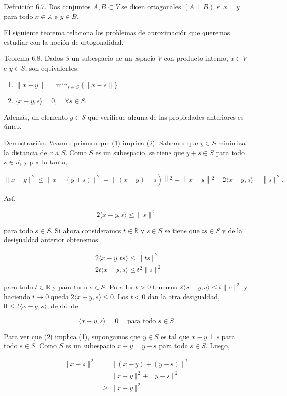 \documentclass[10pt]{article}
\begin{document}
Definición 6.7. Dos conjuntos $A, B \subset V$ se dicen ortogonales $(A \perp B)$ si $x \perp y$ para todo $x \in A$ e $y \in B$.

El siguiente teorema relaciona los problemas de aproximación que queremos estudiar con la noción de ortogonalidad.

Teorema 6.8. Dados $S$ un subespacio de un espacio $V$ con producto interno, $x \in V$ e $y \in S$, son equivalentes:

\begin{enumerate}
  \item $\|x-y\|=\min _{s \in S}\{\|x-s\|\}$
  \item $\langle x-y, s\rangle=0, \quad \forall s \in S$.
\end{enumerate}

Además, un elemento $y \in S$ que verifique alguna de las propiedades anteriores es único.

Demostración. Veamos primero que (1) implica (2). Sabemos que $y \in S$ minimiza la distancia de $x$ a $S$. Como $S$ es un subespacio, se tiene que $y+s \in S$ para todo $s \in S$, y por lo tanto,

$$
\left.\|x-y\|^{2} \leq\|x-(y+s)\|^{2}=\|(x-y)-s\right)\left\|^{2}=\right\| x-y\left\|^{2}-2\langle x-y, s\rangle+\right\| s \|^{2} .
$$

Así,

$$
2\langle x-y, s\rangle \leq\|s\|^{2}
$$

para todo $s \in S$. Si ahora consideramos $t \in \mathbb{R}$ y $s \in S$ se tiene que $t s \in S$ y de la desigualdad anterior obtenemos

$$
\begin{aligned}
& 2\langle x-y, t s\rangle \leq\|t s\|^{2} \\
& 2 t\langle x-y, s\rangle \leq t^{2}\|s\|^{2}
\end{aligned}
$$

para todo $t \in \mathbb{R}$ y para todo $s \in S$. Para los $t>0$ tenemos $2\langle x-y, s\rangle \leq t\|s\|^{2}$ y haciendo $t \rightarrow 0$ queda $2\langle x-y, s\rangle \leq 0$. Los $t<0$ dan la otra desigualdad, $0 \leq 2\langle x-y, s\rangle$; de dónde

$$
\langle x-y, s\rangle=0 \quad \text { para todo } s \in S
$$

Para ver que (2) implica (1), supongamos que $y \in S$ es tal que $x-y \perp s$ para todo $s \in S$. Como $S$ es un subespacio $x-y \perp y-s$ para todo $s \in S$. Luego,

$$
\begin{aligned}
\|x-s\|^{2} & =\|(x-y)+(y-s)\|^{2} \\
& =\|x-y\|^{2}+\|y-s\|^{2} \\
& \geq\|x-y\|^{2}
\end{aligned}
$$
\end{document}
